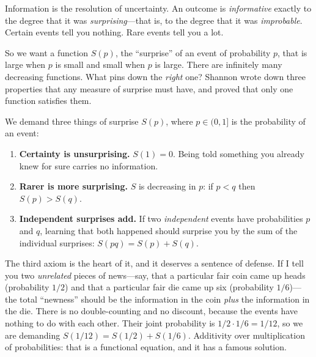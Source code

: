 \begin{intuitionbox}
Information is the resolution of uncertainty. An outcome is \emph{informative} exactly to the degree that
it was \emph{surprising}---that is, to the degree that it was \emph{improbable}. Certain events tell you
nothing. Rare events tell you a lot.
\end{intuitionbox}

So we want a function $S(p)$, the ``surprise'' of an event of probability $p$, that is large when $p$ is
small and small when $p$ is large. There are infinitely many decreasing functions. What pins down the
\emph{right} one? Shannon wrote down three properties that any measure of surprise
must have, and proved that only one function satisfies them.

\begin{focusbox}
We demand three things of surprise $S(p)$, where $p \in (0,1]$ is the probability of an event:
\begin{enumerate}
  \item \textbf{Certainty is unsurprising.} $S(1) = 0$. Being told something you already knew for sure
        carries no information.
  \item \textbf{Rarer is more surprising.} $S$ is decreasing in $p$: if $p < q$ then $S(p) > S(q)$.
  \item \textbf{Independent surprises add.} If two \emph{independent} events have probabilities $p$ and
        $q$, learning that both happened should surprise you by the sum of the individual surprises:
        $S(pq) = S(p) + S(q)$.
\end{enumerate}
\end{focusbox}

The third axiom is the heart of it, and it deserves a sentence of defense. If I tell you two
\emph{unrelated} pieces of news---say, that a particular fair coin came up heads (probability $1/2$) and
that a particular fair die came up six (probability $1/6$)---the total ``newness'' should be the
information in the coin \emph{plus} the information in the die. There is no double-counting and no
discount, because the events have nothing to do with each other. Their joint probability is $1/2 \cdot
1/6 = 1/12$, so we are demanding $S(1/12) = S(1/2) + S(1/6)$. Additivity over multiplication of
probabilities: that is a functional equation, and it has a famous solution.

